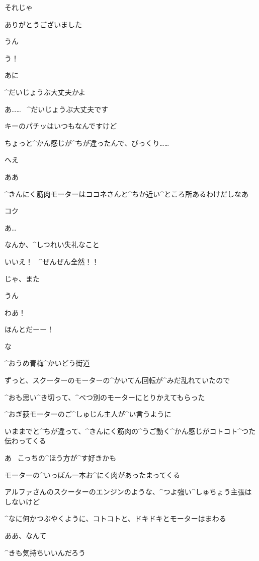 \Kokone それじゃ

\Kokone ありがとうございました

\Person うん

\page[134]
\Kokone う！

\Person あに

\Person ^{だいじょうぶ}{大丈夫}かよ

\Kokone あ……
\ ^{だいじょうぶ}{大丈夫}です

\Kokone キーのパチッはいつもなんですけど

\Kokone ちょっと^{かん}{感}じが^{ちが}{違}ったんで、びっくり……

\Person へえ

\page[135]
\Person ああ

\Person ^{きんにく}{筋肉}モーターはココネさんと^{ちか}{近}い^{ところ}{所}あるわけだしなあ

\Kokone コク

\Person あ…

\Person なんか、^{しつれい}{失礼}なこと

\Kokone いいえ！
\ ^{ぜんぜん}{全然}！！

\Kokone じゃ、また

\Person うん

\page[136]
\Kokone わあ！

\Kokone ほんとだーー！

\Person な

\page[137]
\Sign ^{おうめ}{青梅}^{かいどう}{街道}

\Kokone ずっと、スクーターのモーターの^{かいてん}{回転}が^{みだ}{乱}れていたので

\Kokone ^{おも}{思}い^{き}{切}って、^{べつ}{別}のモーターにとりかえてもらった

\Kokone ^{おぎ}{荻}モーターのご^{しゅじん}{主人}が^{い}{言}うように

\Kokone いままでと^{ちが}{違}って、^{きんにく}{筋肉}の^{うご}{動}く^{かん}{感}じがコトコト^{つた}{伝}わってくる

\Kokone あ
\ こっちの^{ほう}{方}が^{す}{好}きかも

\page[138]
\Kokone モーターの^{いっぽん}{一本}お^{にく}{肉}があったまってくる

\Kokone アルファさんのスクーターのエンジンのような、^{つよ}{強}い^{しゅちょう}{主張}はしないけど

\Kokone ^{なに}{何}かつぶやくように、コトコトと、ドキドキとモーターはまわる

\page[139]
\Kokone ああ、なんて

\Kokone ^{きも}{気持}ちいいんだろう

